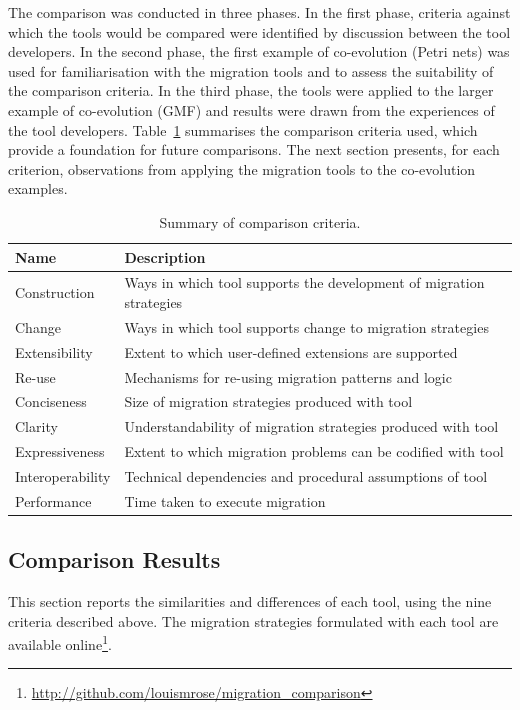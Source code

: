 The comparison was conducted in three phases. In the first phase, criteria against which the tools would be compared were identified by discussion between the tool developers. In the second phase, the first example of co-evolution (Petri nets) was used for familiarisation with the migration tools and to assess the suitability of the comparison criteria. In the third phase, the tools were applied to the larger example of co-evolution (GMF) and results were drawn from the experiences of the tool developers. Table~\ref{tab:criteria} summarises the comparison criteria used, which provide a foundation for future comparisons. The next section presents, for each criterion, observations from applying the migration tools to the co-evolution examples.

\begin{table}[hbtp]
	\centering
	\begin{tabular}{|p{3cm}|p{9cm}|}
	\hline
	\textbf{Name}    & \textbf{Description} \\
	\hline
	Construction     & Ways in which tool supports the development of migration strategies \\
	\hline
	Change           & Ways in which tool supports change to migration strategies \\
	\hline
	Extensibility    & Extent to which user-defined extensions are supported \\
	\hline
	Re-use           & Mechanisms for re-using migration patterns and logic \\
	\hline
	Conciseness      & Size of migration strategies produced with tool \\
	\hline
	Clarity          & Understandability of migration strategies produced with tool \\
	\hline
	Expressiveness   & Extent to which migration problems can be codified with tool \\
	\hline
	Interoperability & Technical dependencies and procedural assumptions of tool \\
	\hline
	Performance      & Time taken to execute migration \\
	\hline
	\end{tabular}
	\label{tab:criteria}
	\caption{Summary of comparison criteria.}
\end{table}


\subsection{Comparison Results}
\label{sec:results}
This section reports the similarities and differences of each tool, using the nine criteria described above. The migration strategies formulated with each tool are available online\footnote{\url{http://github.com/louismrose/migration_comparison}}. 

